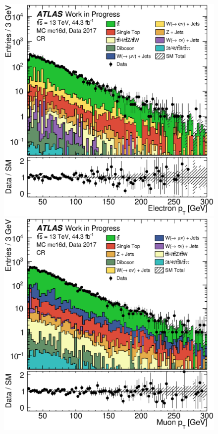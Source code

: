 \clearpage{}
\begin{figure}[th!]
    \centering
    \setlength{\individualPlotWidth}{0.434\fulllinewidth}
    \includegraphics[width=\individualPlotWidth]{Assets/Plots/withTF/e-channel/h_stack_mc16d_data17_el_pt.eps}
    \hspace{1em}
    \includegraphics[width=\individualPlotWidth]{Assets/Plots/withTF/mu-channel/h_stack_mc16d_data17_mu_pt.eps}
    

\end{figure}

